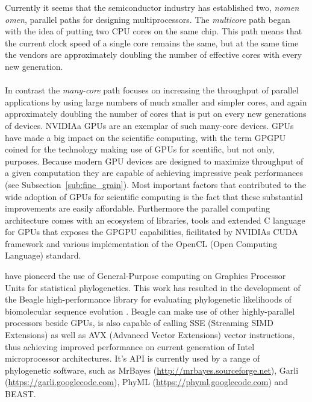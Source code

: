 Currently it seems that the semiconductor industry has established two, \textit{nomen omen}, parallel paths for designing multiprocessors.
The \textit{multicore} path began with the idea of putting two CPU cores on the same chip.
This path means that the current clock speed of a single core remains the same, but at the same time the vendors are approximately doubling the number of effective cores with every new generation.

\paragraph{}
In contrast the \textit{many-core} path focuses on increasing the throughput of parallel applications by using large numbers of much smaller and simpler cores, and again approximately doubling the number of cores that is put on every new generations of devices. 
NVIDIAa GPUs are an exemplar of such many-core devices.
GPUs \citep{Nickolls2008} have made a big impact on the scientific computing, with the term GPGPU coined for the technology making use of GPUs for scentific, but not only, purposes.
Because modern GPU devices are designed to maximize throughput of a given computation they are capable of achieving impressive peak performances (see Subsection~\ref{sub:fine_grain}).
Most important factors that contributed to the wide adoption of GPUs for scientific computing is the fact that these substantial improvements are easily affordable. 
Furthermore the parallel computing architecture comes with an ecosystem of libraries, tools and extended C language for GPUs that exposes the GPGPU capabilities, ficilitated by NVIDIAs CUDA framework and various implementation of the OpenCL (Open Computing Language) standard.

\cite{Suchard2009} have pioneerd the use of General-Purpose computing on Graphics Processor Units for statistical phylogenetics.
This work has resulted in the development of the Beagle high-performance library for  evaluating phylogenetic likelihoods of biomolecular sequence evolution \citep{Ayres2012}.
Beagle can make use of other highly-parallel processors beside GPUs, is also capable of calling SSE (Streaming SIMD Extensions) as well as AVX (Advanced Vector Extensions) vector instructions, thus achieving improved performance on current generation of Intel microprocessor architectures.
It's API is currently used by a range of phylogenetic software, such as MrBayes (\url{http://mrbayes.sourceforge.net}), Garli (\url{https://garli.googlecode.com}), PhyML (\url{https://phyml.googlecode.com}) and BEAST.

